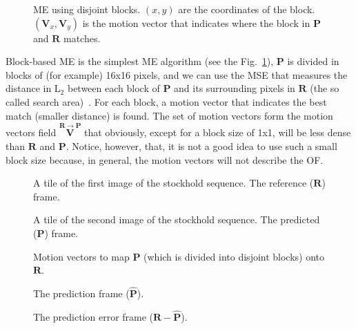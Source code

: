 \begin{figure}
  \centering
  \caption{ME using disjoint blocks. $(x,y)$ are the coordinates of
    the block. $({\mathbf V}_x, {\mathbf V}_y)$ is the motion vector
    that indicates where the block in ${\mathbf P}$ and ${\mathbf R}$
    matches.}
  \label{fig:simple}
\end{figure}

Block-based ME is the simplest ME algorithm (see the
Fig.~\ref{fig:simple}), ${\mathbf P}$ is divided in blocks of (for
example) 16x16 pixels, and we can use the MSE that measures the
distance in L$_2$ between each block of ${\mathbf P}$ and its
surrounding pixels in ${\mathbf R}$ (the so called search
area)~\cite{zhu2000new}. For each block, a motion vector that
indicates the best match (smaller distance) is found. The set of
motion vectors form the motion vectors field $\overset{{\mathbf
    R}\rightarrow {\mathbf P}}{\mathbf V}$ that obviously, except for
a block size of 1x1, will be less dense than ${\mathbf R}$ and
${\mathbf P}$. Notice, however, that, it is not a good idea to use
such a small block size because, in general, the motion vectors will
not describe the OF.

\begin{figure}
  \centering
  \caption{A tile of the first image of the stockhold sequence. The reference (${\mathbf R}$) frame.}
  \label{fig:R}
\end{figure}

\begin{figure}
  \centering
  \caption{A tile of the second image of the stockhold sequence. The predicted (${\mathbf P}$) frame.}
  \label{fig:P}
\end{figure}

\begin{figure}
  \centering
  \caption{Motion vectors to map ${\mathbf P}$ (which is divided into disjoint blocks) onto ${\mathbf R}$. }
  \label{fig:MVs}
\end{figure}

\begin{figure}
  \centering
  \caption{The prediction frame (${\hat{\mathbf P}}$).}
  \label{fig:hatP}
\end{figure}

\begin{figure}
  \centering
  \caption{The prediction error frame (${\mathbf R} - {\hat{\mathbf P}}$).}
  \label{fig:error}
\end{figure}

